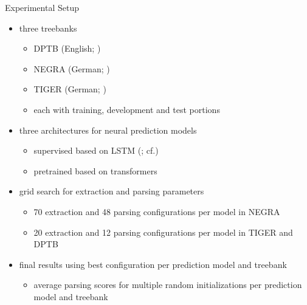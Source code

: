 \documentclass[slides]{subfiles}
\begin{document}
\begin{frame}{Experimental Setup}
        \begin{itemize}
            \item<1-> three treebanks
            \begin{itemize}
                \item DPTB (English; \citealp{EvaKal11})
                \item NEGRA (German; \citealp{Skut98})
                \item TIGER (German; \citealp{Brants04})
                \item each with training, development and test portions
            \end{itemize}
            \item<2-> three architectures for neural prediction models
            \begin{itemize}
                \item<3-> supervised based on LSTM (\citealp{Hoc97}; cf.\@ \citealp{vaswani2016supertagging, Cor20, StaSte20})
                \item<3-> pretrained based on transformers \citep[BERT-base, BERT-large or equivalent;][]{vaswani2017attention, Devlin2019}
            \end{itemize}
            \item<4-> grid search for extraction and parsing parameters
            \begin{itemize}
                \item 70 extraction and 48 parsing configurations per model in NEGRA
                \item 20 extraction and 12 parsing configurations per model in TIGER and DPTB
            \end{itemize}
            \item<5-> final results using best configuration per prediction model and treebank
            \begin{itemize}
                \item average parsing scores for multiple random initializations per prediction model and treebank
            \end{itemize}
        \end{itemize}
    \end{frame}
\end{document}
